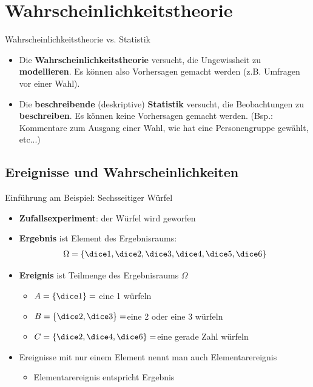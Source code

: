 \section{Wahrscheinlichkeitstheorie}

\begin{frame}{Wahrscheinlichkeitstheorie vs. Statistik}
    \begin{itemize}
        \item Die \textbf{Wahrscheinlichkeitstheorie} versucht, die Ungewissheit zu \textbf{modellieren}. Es können also Vorhersagen gemacht werden (z.B. Umfragen vor einer Wahl).
        \item Die \textbf{beschreibende} (deskriptive) \textbf{Statistik} versucht, die Beobachtungen zu \textbf{beschreiben}. Es können keine Vorhersagen gemacht werden. 
        (Bsp.: Kommentare zum Ausgang einer Wahl, wie hat eine Personengruppe gewählt, etc...)
    \end{itemize}
\end{frame}

\subsection{Ereignisse und Wahrscheinlichkeiten}

\begin{frame}{Einführung am Beispiel: Sechsseitiger Würfel}
  \begin{itemize}
  \item \textbf{Zufallsexperiment}: der Würfel wird geworfen
  \item \textbf{Ergebnis} ist Element des Ergebnisraums:
    \begin{gather*}
      \Omega=\left\{\dice1,\dice2,\dice3,\dice4,\dice5,\dice6\right\}
    \end{gather*}
  \item \textbf{Ereignis} ist Teilmenge des Ergebnisraums $\Omega$
    \begin{itemize}
    \item $A = \left\{\dice1\right\}=$ \glqq eine 1 würfeln\grqq 
    \item $B = \left\{\dice2,\dice3\right\}=$\glqq eine 2 oder eine 3 würfeln\grqq 
    \item $C = \left\{\dice2,\dice4,\dice6\right\}=$\grqq eine gerade Zahl würfeln\grqq
    \end{itemize} 
  \item Ereignisse mit nur einem Element nennt man auch Elementarereignis
    \begin{itemize}
    \item Elementarereignis entspricht Ergebnis
    \end{itemize}
  \end{itemize}
\end{frame}

